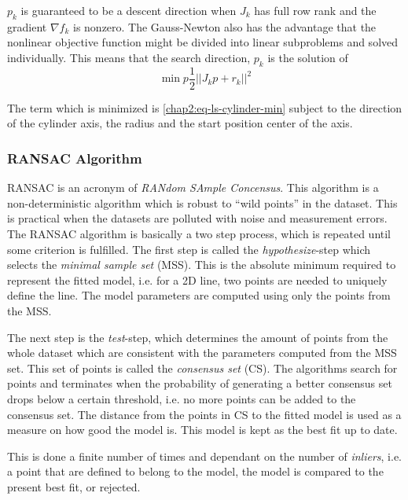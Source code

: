 $p_k$ is guaranteed to be a descent direction when $J_k$ has full row rank and the
gradient $\nabla f_k$ is nonzero. The Gauss-Newton also has the advantage that the
nonlinear objective function might be divided into linear subproblems and solved
individually. This means that the search direction, $p_k$ is the solution of
\begin{equation}
    \min{p} \frac{1}{2} || J_k p + r_k ||^2
\end{equation}

The term which is minimized is \eqref{chap2:eq-ls-cylinder-min} subject to the direction
of the cylinder axis, the radius and the start position center of the axis. 


\subsubsection{RANSAC Algorithm}
RANSAC is an acronym of \emph{RANdom SAmple Concensus}. This algorithm is a
non-deterministic algorithm which is robust to ``wild points'' in the dataset. This is
practical when the datasets are polluted with noise and measurement errors.
The RANSAC algorithm is basically a two step process, which is repeated until some
criterion is fulfilled. The first step is called the \emph{hypothesize}-step which selects
the \emph{minimal sample set} (MSS). This is the absolute minimum required to represent
the fitted model, i.e. for a 2D line, two points are needed to uniquely define the
line. The model parameters are computed using only the points from the MSS.

The next step is the \emph{test}-step, which determines the amount of points from the
whole dataset which are consistent with the parameters computed from the MSS set. This set
of points is called the \emph{consensus set} (CS). The algorithms search for points and
terminates when the probability of generating a better consensus set drops below a certain threshold, i.e.
no more points can be added to the consensus set. The distance from the points in CS to the 
fitted model is used as a measure on how good the model is. This model is kept as the best
fit up to date. \cite{ransac-dummies}

This is done a finite number of times and dependant on the number of \emph{inliers}, i.e.
a point that are defined to belong to the model, the model is compared to the present best
fit, or rejected.

